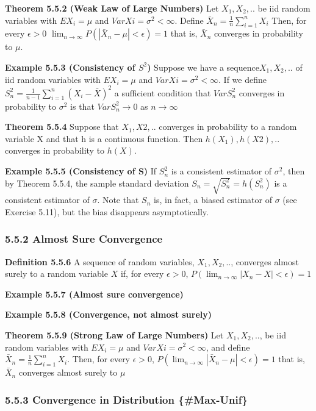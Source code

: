 \documentclass[10pt,twocolumn,portrait]{article}
\begin{document}
\textbf{Theorem 5.5.2 (Weak Law of Large Numbers)} Let \(X_1,X_2,..\) be
iid random variables with \(EX_i=\mu\) and \(Var Xi =\sigma^2<\infty\).
Define \(\bar X_n=\frac1n\sum_{i=1}^nX_i\) Then, for every
\(\epsilon>0\) \(\lim_{n\to\infty}P(|\bar X_n-\mu|<\epsilon)=1\) that
is, \(\bar X_n\) converges in probability to \(\mu\).

\textbf{Example 5.5.3 (Consistency of \(S^2\))} Suppose we have a
sequence\(X_1,X_2,..\) of iid random variables with \(EX_i=\mu\) and
\(Var Xi =\sigma^2<\infty\). If we define
\(S_n^2=\frac1{n-1}\sum_{i=1}^n(X_i-\bar X)^2\) a sufficient condition
that \(VarS^2_n\) converges in probability to \(\sigma^2\) is that
\(VarS^2_n\to0\) as \(n\to\infty\)

\textbf{Theorem 5.5.4} Suppose that \(X_1, X2,..\) converges in
probability to a random variable X and that h is a continuous function.
Then \(h(X_1),h(X2),..\) converges in probability to \(h(X)\).

\textbf{Example 5.5.5 (Consistency of S)} If \(S^2_n\) is a consistent
estimator of \(\sigma^2\), then by Theorem 5.5.4, the sample standard
deviation \(S_n=\sqrt{S^2_n}=h(S^2_n)\) is a consistent estimator of
\(\sigma\). Note that \(S_n\) is, in fact, a biased estimator of
\(\sigma\) (see Exercise 5.11), but the bias disappears asymptotically.

\hypertarget{almost-sure-convergence}{%
\subsubsection{5.5.2 Almost Sure
Convergence}\label{almost-sure-convergence}}

\textbf{Definition 5.5.6} A sequence of random variables,
\(X_1,X_2,..\), converges almost surely to a random variable \(X\) if,
for every \(\epsilon>0\), \(P(\lim_{n\to\infty}|X_n-X|<\epsilon)=1\)

\textbf{Example 5.5.7 (Almost sure convergence)}

\textbf{Example 5.5.8 (Convergence, not almost surely)}

\textbf{Theorem 5.5.9 (Strong Law of Large Numbers)} Let \(X_1,X_2,..\),
be iid random variables with \(EX_i=\mu\) and
\(Var Xi =\sigma^2<\infty\), and define
\(\bar X_n=\frac1n\sum_{i=1}^nX_i\). Then, for every \(\epsilon>0\),
\(P(\lim_{n\to\infty}|\bar X_n-\mu|<\epsilon)=1\) that is, \(\bar X_n\)
converges almost surely to \(\mu\)

\hypertarget{CLT}{%
\subsubsection{5.5.3 Convergence in Distribution
\{\#Max-Unif\}}\label{CLT}}
\end{document}
